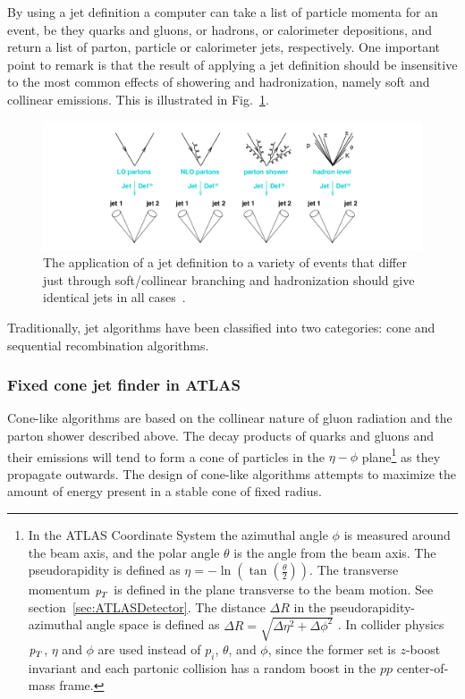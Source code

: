 By using a jet definition a computer can take a list of particle momenta for an event, be they quarks and gluons, or hadrons, or calorimeter depositions, and return a list of parton, particle or calorimeter jets, respectively. One important point to remark is that the result of applying a jet definition should be insensitive to the most common effects of showering and hadronization, namely soft and collinear emissions. This is illustrated in Fig.~\ref{fig:jetdefinition}.

\begin{figure}[htbp]
  \begin{center}
      \includegraphics[width=1\textwidth]{Fig2/jetdefinition.png}
    \caption{The application of a jet definition to a variety of events that differ just through soft/collinear branching and hadronization should give identical jets in all cases~\cite{GavinLectures}.}
    \label{fig:jetdefinition}
  \end{center}
\end{figure}

Traditionally, jet algorithms have been classified into two categories: cone and sequential recombination algorithms. 

\subsubsection{Fixed cone jet finder in ATLAS}


 Cone-like algorithms are based on the collinear nature of gluon radiation and the parton shower described above. The decay products of quarks and gluons and their emissions will tend to form a cone of particles in the $\eta - \phi$ plane\footnote{In the ATLAS Coordinate System the azimuthal angle $\phi$ is measured around the beam axis, and the polar angle $\theta$ is the angle from the beam axis. The pseudorapidity is defined as $\eta = − \ln( \tan(\frac{\theta}{2}))$. The transverse momentum ${\emph{p}_{T}}$ is defined in the plane transverse to the beam motion. See section~\ref{sec:ATLASDetector}.  The distance $\Delta R$ in the pseudorapidity-azimuthal angle space is defined as $\Delta R = \sqrt{ \Delta \eta^2  + \Delta \phi^2}$ . In collider physics ${\emph{p}_{T}}$, $\eta$ and $\phi$ are used instead of $p_i$, $\theta$, and $\phi$, since the former set is $z$-boost invariant and each partonic collision has a random boost in the $pp$ center-of-mass frame.} as they propagate outwards. 
The design of cone-like algorithms attempts to maximize the amount of energy present in a stable cone of fixed radius. 


